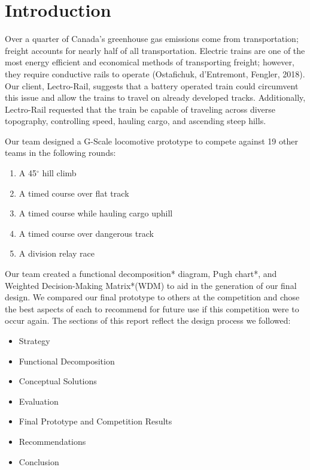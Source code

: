 \documentclass[class=../report, crop=false]{standalone}
\begin{document}
\section{Introduction}

Over a quarter of Canada’s greenhouse gas emissions come from transportation; freight accounts for nearly half of all transportation.
Electric trains are one of the most energy efficient and economical methods of transporting freight; however, they require conductive rails to operate (Ostafichuk, d’Entremont, Fengler, 2018).
Our client, Lectro-Rail, suggests that a battery operated train could circumvent this issue and allow the trains to travel on already developed tracks.
Additionally, Lectro-Rail requested that the train be capable of traveling across diverse topography, controlling speed, hauling cargo, and ascending steep hills.

Our team designed a G-Scale locomotive prototype to compete against 19 other teams in the following rounds:

\begin{enumerate}
	\item A 45$^{\circ}$ hill climb
	\item A timed course over flat track
	\item A timed course while hauling cargo uphill
	\item A timed course over dangerous track 
	\item A division relay race
\end{enumerate}

Our team created a functional decomposition* diagram, Pugh chart*, and Weighted Decision-Making Matrix*(WDM) to aid in the generation of our final design.
We compared our final prototype to others at the competition and chose the best aspects of each to recommend for future use if this competition were to occur again.
The sections of this report reflect the design process we followed:

\begin{itemize}
	\item Strategy
	\item Functional Decomposition
	\item Conceptual Solutions
	\item Evaluation
	\item Final Prototype and Competition Results
	\item Recommendations
	\item Conclusion
\end{itemize}
\end{document}
